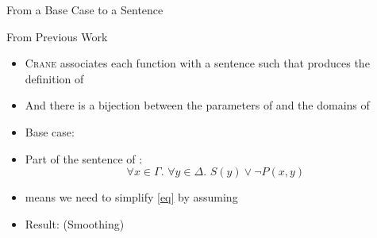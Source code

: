\documentclass{beamer}
\begin{document}
\begin{frame}[fragile]{From a Base Case to a Sentence}
  \begin{block}{From Previous
      Work~\textcolor{gray}{\parencite{DBLP:conf/kr/DilkasB23}}}
    \begin{itemize}
      \item \alert{\textsc{Crane}} associates each function  with a
            sentence \structure{$\phi$} such that
             produces the definition of
      \item And there is a bijection between the \alert{parameters} of
             and the \alert{domains} of \structure{$\phi$}
    \end{itemize}
  \end{block}
  \begin{example}
    \begin{itemize}
      \item Base case: 
      \item<3-> \alert{Part} of the sentence of :
            \begin{equation}\label{eq}
              \forall x \in \Gamma\text{. }\forall y \in \Delta\text{. }S(y) \lor \neg P(x, y)
            \end{equation}
      \item<4->  means we need to simplify \eqref{eq}
            by assuming 
      \item<5-> Result: \hfill(\alert{Smoothing})
    \end{itemize}
  \end{example}
\end{frame}
\end{document}

